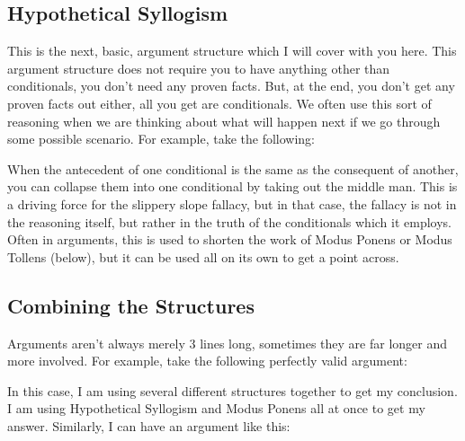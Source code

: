 \subsection{Hypothetical Syllogism}
\label{s:p1.3.4}

This is the next, basic, argument structure which I will cover with you here. This argument structure does not require you to have anything other than conditionals, you don't need any proven facts. But, at the end, you don't get any proven facts out either, all you get are conditionals. We often use this sort of reasoning when we are thinking about what will happen next if we go through some possible scenario. For example, take the following:


When the antecedent of one conditional is the same as the consequent of another, you can collapse them into one conditional by taking out the middle man. This is a driving force for the slippery slope fallacy, but in that case, the fallacy is not in the reasoning itself, but rather in the truth of the conditionals which it employs. Often in arguments, this is used to shorten the work of Modus Ponens or Modus Tollens (below), but it can be used all on its own to get a point across. 

\subsection{Combining the Structures}

Arguments aren't always merely 3 lines long, sometimes they are far longer and more involved. For example, take the following perfectly valid argument:


In this case, I am using several different structures together to get my conclusion. I am using Hypothetical Syllogism and Modus Ponens all at once to get my answer. Similarly, I can have an argument like this:


